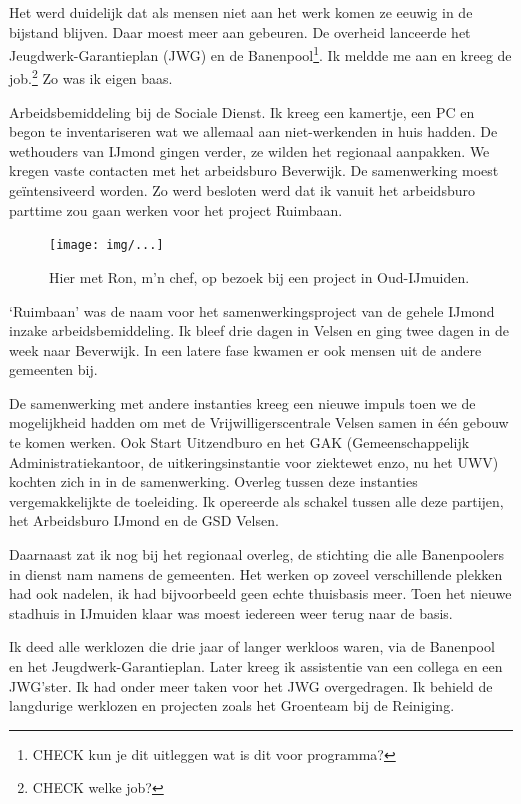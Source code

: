 \documentclass[12pt,twoside, openright]{memoir}
\begin{document}
Het werd duidelijk dat als mensen niet aan het werk komen ze eeuwig in de bijstand blijven. Daar moest meer aan gebeuren. De overheid lanceerde het Jeugdwerk-Garantieplan (JWG) en de Banenpool\footnote{CHECK kun je dit uitleggen wat is dit voor programma?}. Ik meldde me aan en kreeg de job.\footnote{CHECK welke job?} Zo was ik eigen baas. 

Arbeidsbemiddeling bij de Sociale Dienst. Ik kreeg een kamertje, een PC en begon te inventariseren wat we allemaal aan niet-werkenden in huis hadden. De wethouders van IJmond gingen verder, ze wilden het regionaal aanpakken. We kregen vaste contacten met het arbeidsburo Beverwijk. De samenwerking moest geïntensiveerd worden. Zo werd besloten werd dat ik vanuit het arbeidsburo parttime zou gaan werken voor het project Ruimbaan.

\begin{figure}[t]
\texttt{[image: img/...]}
\caption{Hier met Ron, m’n chef, op bezoek bij een project in Oud-IJmuiden.}
\end{figure}

`Ruimbaan' was de naam voor het samenwerkingsproject van de gehele IJmond inzake arbeidsbemiddeling. Ik bleef drie dagen in Velsen en ging twee dagen in de week naar Beverwijk. In een latere fase kwamen er ook mensen uit de andere gemeenten bij. 

De samenwerking met andere instanties kreeg een nieuwe impuls toen we de mogelijkheid hadden om met de Vrijwilligerscentrale Velsen samen in één gebouw te komen werken. Ook Start Uitzendburo en het GAK (Gemeenschappelijk Administratiekantoor, de uitkeringsinstantie voor ziektewet enzo, nu het UWV) kochten zich in in de samenwerking. Overleg tussen deze instanties vergemakkelijkte de toeleiding. Ik opereerde als schakel tussen alle deze partijen, het Arbeidsburo IJmond en de GSD Velsen. 

Daarnaast zat ik nog bij het regionaal overleg, de stichting die alle Banenpoolers in dienst nam namens de gemeenten. Het werken op zoveel verschillende plekken had ook nadelen, ik had bijvoorbeeld geen echte thuisbasis meer. Toen het nieuwe stadhuis in IJmuiden klaar was moest iedereen weer terug naar de basis. 

Ik deed alle werklozen die drie jaar of langer werkloos waren, via de Banenpool en het Jeugdwerk-Garantieplan. Later kreeg ik assistentie van een collega en een JWG’ster. Ik had onder meer taken voor het JWG overgedragen. Ik behield de langdurige werklozen en projecten zoals het Groenteam bij de Reiniging. 
\end{document}
